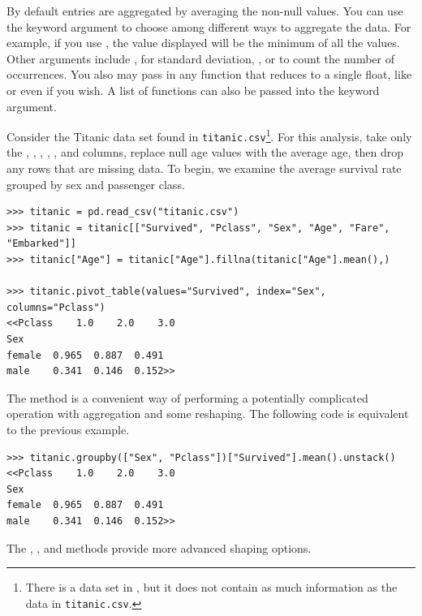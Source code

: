 By default entries are aggregated by averaging the non-null values.
You can use the keyword argument  to choose among different ways to aggregate the data.
For example, if you use , the value displayed will be the minimum of all the values.
Other arguments include ,  for standard deviation, , or  to count the number of occurrences.
You also may pass in any function that reduces to a single float, like  or even  if you wish.
A list of functions can also be passed into the  keyword argument.

Consider the Titanic data set found in \texttt{titanic.csv}\footnote{There is a  data set in , but it does not contain as much information as the data in \texttt{titanic.csv}.}.
For this analysis, take only the , , , , , and  columns, replace null age values with the average age, then drop any rows that are missing data.
To begin, we examine the average survival rate grouped by sex and passenger class.

\begin{lstlisting}
>>> titanic = pd.read_csv("titanic.csv")
>>> titanic = titanic[["Survived", "Pclass", "Sex", "Age", "Fare", "Embarked"]]
>>> titanic["Age"] = titanic["Age"].fillna(titanic["Age"].mean(),)

>>> titanic.pivot_table(values="Survived", index="Sex", columns="Pclass")
<<Pclass    1.0    2.0    3.0
Sex
female  0.965  0.887  0.491
male    0.341  0.146  0.152>>
\end{lstlisting}

\begin{info} %
The  method is a convenient way of performing a potentially complicated  operation with aggregation and some reshaping.
The following code is equivalent to the previous example.

\begin{lstlisting}
>>> titanic.groupby(["Sex", "Pclass"])["Survived"].mean().unstack()
<<Pclass    1.0    2.0    3.0
Sex
female  0.965  0.887  0.491
male    0.341  0.146  0.152>>
\end{lstlisting}

The , , and  methods provide more advanced shaping options.
\end{info}


